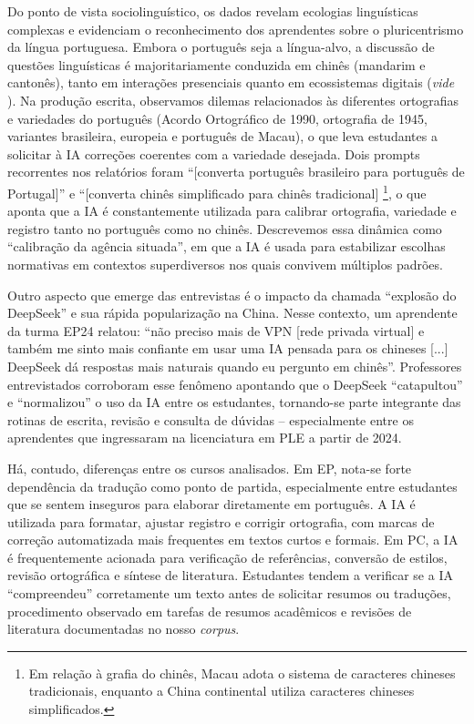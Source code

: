 \documentclass[portuguese]{textolivre}
\begin{document}
Do ponto de vista sociolinguístico, os dados revelam ecologias linguísticas complexas e evidenciam o reconhecimento dos aprendentes sobre o pluricentrismo da língua portuguesa. Embora o português seja a língua-alvo, a discussão de questões linguísticas é majoritariamente conduzida em chinês (mandarim e cantonês), tanto em interações presenciais quanto em ecossistemas digitais (\textit{vide} ). Na produção escrita, observamos dilemas relacionados às diferentes ortografias e variedades do português (Acordo Ortográfico de 1990, ortografia de 1945, variantes brasileira, europeia e português de Macau), o que leva estudantes a solicitar à IA correções coerentes com a variedade desejada. Dois prompts recorrentes nos relatórios foram “[converta português brasileiro para português de Portugal]” e “[converta chinês simplificado para chinês tradicional] \footnote{Em relação à grafia do chinês, Macau adota o sistema de caracteres chineses tradicionais, enquanto a China continental utiliza caracteres chineses simplificados.}, o que aponta que a IA é constantemente utilizada para calibrar ortografia, variedade e registro tanto no português como no chinês. Descrevemos essa dinâmica como “calibração da agência situada”, em que a IA é usada para estabilizar escolhas normativas em contextos superdiversos nos quais convivem múltiplos padrões.

Outro aspecto que emerge das entrevistas é o impacto da chamada “explosão do DeepSeek” e sua rápida popularização na China. Nesse contexto, um aprendente da turma EP24 relatou: “não preciso mais de VPN [rede privada virtual] e também me sinto mais confiante em usar uma IA pensada para os chineses [...] DeepSeek dá respostas mais naturais quando eu pergunto em chinês”. Professores entrevistados corroboram esse fenômeno apontando que o DeepSeek “catapultou” e “normalizou” o uso da IA entre os estudantes, tornando-se parte integrante das rotinas de escrita, revisão e consulta de dúvidas – especialmente entre os aprendentes que ingressaram na licenciatura em PLE a partir de 2024.

Há, contudo, diferenças entre os cursos analisados. Em EP, nota-se forte dependência da tradução como ponto de partida, especialmente entre estudantes que se sentem inseguros para elaborar diretamente em português. A IA é utilizada para formatar, ajustar registro e corrigir ortografia, com marcas de correção automatizada mais frequentes em textos curtos e formais. Em PC, a IA é frequentemente acionada para verificação de referências, conversão de estilos, revisão ortográfica e síntese de literatura. Estudantes tendem a verificar se a IA “compreendeu” corretamente um texto antes de solicitar resumos ou traduções, procedimento observado em tarefas de resumos acadêmicos e revisões de literatura documentadas no nosso \textit{corpus}.
\end{document}
